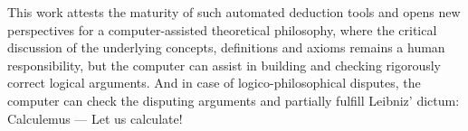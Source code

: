 \documentclass{llncs}
\begin{document}
This work attests the maturity of such automated deduction tools and 
opens new perspectives for a computer-assisted theoretical philosophy, 
where the critical discussion of the underlying 
concepts, definitions and axioms remains a human responsibility, but the computer can assist 
in building and checking rigorously correct logical arguments. And in case of 
logico-philosophical disputes, the computer can check the disputing arguments
and partially fulfill Leibniz' dictum:
Calculemus --- Let us calculate!
\end{document}

